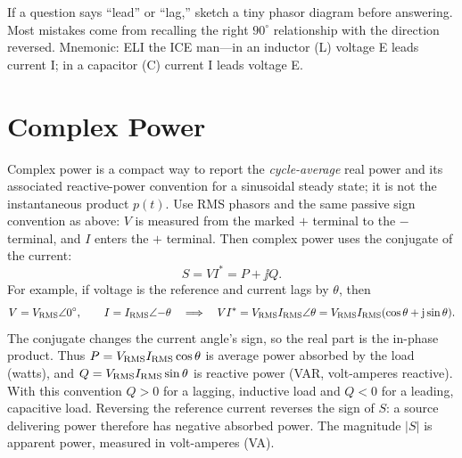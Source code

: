 \begin{exambox}
If a question says ``lead'' or ``lag,'' sketch a tiny phasor diagram before
answering. Most mistakes come from recalling the right \(90^\circ\) relationship
with the direction reversed. Mnemonic: ELI the ICE man---in an inductor (L)
voltage E leads current I; in a capacitor (C) current I leads voltage E.
\end{exambox}

\section{Complex Power}
Complex power is a compact way to report the \emph{cycle-average} real power and its
associated reactive-power convention for a sinusoidal steady state; it is not the
instantaneous product \(p(t)\).
Use RMS phasors and the same passive sign convention as above: \(V\) is measured
from the marked \(+\) terminal to the \(-\) terminal, and \(I\) enters the \(+\)
terminal. Then complex power uses the conjugate of the current:
\[
S=V I^{*}=P+\jj Q .
\]
For example, if voltage is the reference and current lags by \(\theta\), then
\[
V=V_{\mathrm{RMS}}\angle0^\circ,\qquad I=I_{\mathrm{RMS}}\angle{-\theta}
\quad\Longrightarrow\quad
VI^*=V_{\mathrm{RMS}}I_{\mathrm{RMS}}\angle\theta
=V_{\mathrm{RMS}}I_{\mathrm{RMS}}(\cos\theta+\mathrm{j}\sin\theta).
\]
The conjugate changes the current angle's sign, so the real part is the in-phase
product. Thus \(P=V_{\mathrm{RMS}}I_{\mathrm{RMS}}\cos\theta\) is average power absorbed by the
load (watts), and \(Q=V_{\mathrm{RMS}}I_{\mathrm{RMS}}\sin\theta\) is reactive power (VAR,
volt-amperes reactive). With this convention \(Q>0\) for a lagging, inductive load
and \(Q<0\) for a leading, capacitive load. Reversing the reference current reverses
the sign of \(S\): a source delivering power therefore has negative absorbed power.
The magnitude \(\lvert S\rvert\) is apparent power, measured in volt-amperes (VA).
\cite[pp.~38--39]{white2004highfrequency}

